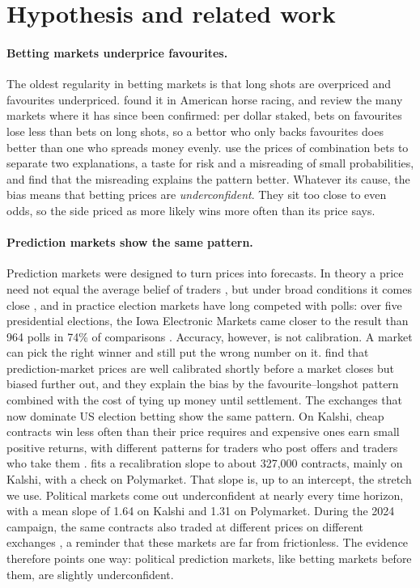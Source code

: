 \section{Hypothesis and related work}\label{sec:related}

\paragraph{Betting markets underprice favourites.}
The oldest regularity in betting markets is that long shots are overpriced and favourites underpriced.
\citet{griffith1949} found it in American horse racing, and \citet{thaler1988} review the many markets where it has
since been confirmed: per dollar staked, bets on favourites lose less than bets on long shots, so a bettor who only
backs favourites does better than one who spreads money evenly. \citet{snowberg2010} use the prices of combination bets
to separate two explanations, a taste for risk and a misreading of small probabilities, and find that the misreading
explains the pattern better. Whatever its cause, the bias means that betting prices are \emph{underconfident}. They sit
too close to even odds, so the side priced as more likely wins more often than its price says.

\paragraph{Prediction markets show the same pattern.}
Prediction markets were designed to turn prices into forecasts. In theory a price need not equal the average belief of
traders \citep{manski2006}, but under broad conditions it comes close \citep{wolfers2006}, and in practice election
markets have long competed with polls: over five presidential elections, the Iowa Electronic Markets came closer to the
result than 964 polls in 74\% of comparisons \citep{berg2008}. Accuracy, however, is not calibration. A market can pick
the right winner and still put the wrong number on it. \citet{page2013} find that prediction-market prices are well
calibrated shortly before a market closes but biased further out, and they explain the bias by the favourite--longshot
pattern combined with the cost of tying up money until settlement. The exchanges that now dominate US election betting
show the same pattern. On Kalshi, cheap contracts win less often than their price requires and expensive ones earn small
positive returns, with different patterns for traders who post offers and traders who take them \citep{burgi2025}.
\citet{le2026} fits a recalibration slope to about 327{,}000 contracts, mainly on Kalshi, with a check on Polymarket. That slope is,
up to an intercept, the stretch we use. Political markets come out underconfident at nearly every time horizon, with a
mean slope of 1.64 on Kalshi and 1.31 on Polymarket. During the 2024 campaign, the same contracts also traded at
different prices on different exchanges \citep{clinton2025}, a reminder that these markets are far from frictionless.
The evidence therefore points one way: political prediction markets, like betting markets before them, are slightly
underconfident.

